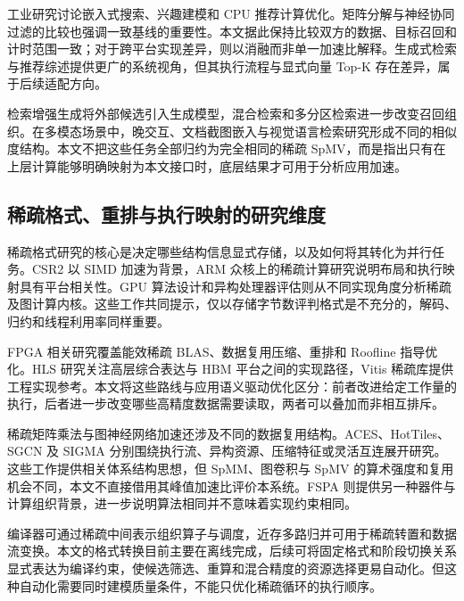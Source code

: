 工业研究讨论嵌入式搜索、兴趣建模和 CPU 推荐计算优化\cite{huang2020embedding,shen2022deep,jain2023optimizing}。矩阵分解与神经协同过滤的比较也强调一致基线的重要性\cite{rendle2020neural}。本文据此保持比较双方的数据、目标召回和计时范围一致；对于跨平台实现差异，则以消融而非单一加速比解释。生成式检索与推荐综述提供更广的系统视角\cite{rajput2023recommender,huang2024comprehensive}，但其执行流程与显式向量 Top-K 存在差异，属于后续适配方向。

检索增强生成将外部候选引入生成模型\cite{lewis2020retrieval,izacard2020leveraging}，混合检索和多分区检索进一步改变召回组织\cite{sawarkar2024blended,wang2024m}。在多模态场景中，晚交互、文档截图嵌入与视觉语言检索研究形成不同的相似度结构\cite{lin2023fine,ma2024unifying,zhan2025elip}。本文不把这些任务全部归约为完全相同的稀疏 SpMV，而是指出只有在上层计算能够明确映射为本文接口时，底层结果才可用于分析应用加速。

\subsection{稀疏格式、重排与执行映射的研究维度}
稀疏格式研究的核心是决定哪些结构信息显式存储，以及如何将其转化为并行任务。CSR2 以 SIMD 加速为背景\cite{bian2020csr2}，ARM 众核上的稀疏计算研究说明布局和执行映射具有平台相关性\cite{ZHENG2023103035}。GPU 算法设计和异构处理器评估则从不同实现角度分析稀疏及图计算内核\cite{chu2023efficient,zhang2019performance}。这些工作共同提示，仅以存储字节数评判格式是不充分的，解码、归约和线程利用率同样重要。

FPGA 相关研究覆盖能效稀疏 BLAS、数据复用压缩、重排和 Roofline 指导优化\cite{dorrance2014scalable,li2023efficient,li2021optimized,favaro2023optimizing}。HLS 研究关注高层综合表达与 HBM 平台之间的实现路径\cite{du2022high}，Vitis 稀疏库提供工程实现参考\cite{vitis_library}。本文将这些路线与应用语义驱动优化区分：前者改进给定工作量的执行，后者进一步改变哪些高精度数据需要读取，两者可以叠加而非相互排斥。

稀疏矩阵乘法与图神经网络加速还涉及不同的数据复用结构。ACES、HotTiles、SGCN 及 SIGMA 分别围绕执行流、异构资源、压缩特征或灵活互连展开研究\cite{ACES,gerogiannis2024hottiles,yoo2023sgcn,qin2020sigma}。这些工作提供相关体系结构思想，但 SpMM、图卷积与 SpMV 的算术强度和复用机会不同，本文不直接借用其峰值加速比评价本系统。FSPA 则提供另一种器件与计算组织背景\cite{zhang2023fspa}，进一步说明算法相同并不意味着实现约束相同。

编译器可通过稀疏中间表示组织算子与调度\cite{yang2023spmmplu}，近存多路归并可用于稀疏转置和数据流变换\cite{feng2022menda}。本文的格式转换目前主要在离线完成，后续可将固定格式和阶段切换关系显式表达为编译约束，使候选筛选、重算和混合精度的资源选择更易自动化。但这种自动化需要同时建模质量条件，不能只优化稀疏循环的执行顺序。

